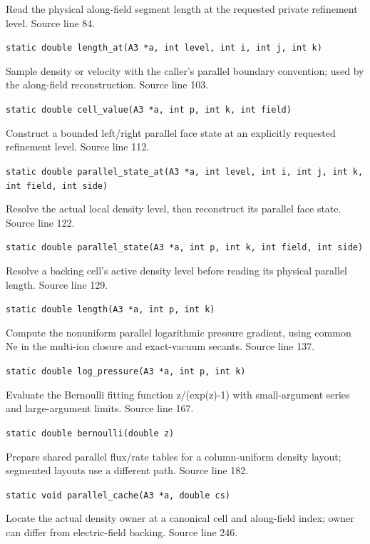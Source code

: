 \begin{description}[style=nextline,leftmargin=0pt,labelindent=0pt,labelwidth=0pt,labelsep=0pt]
\item[\texttt{length\_at}] Read the physical along-field segment length at the requested private refinement level. Source line 84.\par
{\small\nolinkurl{static double length_at(A3 *a, int level, int i, int j, int k)}}
\item[\texttt{cell\_value}] Sample density or velocity with the caller's parallel boundary convention; used by the along-field reconstruction. Source line 103.\par
{\small\nolinkurl{static double cell_value(A3 *a, int p, int k, int field)}}
\item[\texttt{parallel\_state\_at}] Construct a bounded left/right parallel face state at an explicitly requested refinement level. Source line 112.\par
{\small\nolinkurl{static double parallel_state_at(A3 *a, int level, int i, int j, int k, int field, int side)}}
\item[\texttt{parallel\_state}] Resolve the actual local density level, then reconstruct its parallel face state. Source line 122.\par
{\small\nolinkurl{static double parallel_state(A3 *a, int p, int k, int field, int side)}}
\item[\texttt{length}] Resolve a backing cell's active density level before reading its physical parallel length. Source line 129.\par
{\small\nolinkurl{static double length(A3 *a, int p, int k)}}
\item[\texttt{log\_pressure}] Compute the nonuniform parallel logarithmic pressure gradient, using common Ne in the multi-ion closure and exact-vacuum secants. Source line 137.\par
{\small\nolinkurl{static double log_pressure(A3 *a, int p, int k)}}
\item[\texttt{bernoulli}] Evaluate the Bernoulli fitting function z/(exp(z)-1) with small-argument series and large-argument limits. Source line 167.\par
{\small\nolinkurl{static double bernoulli(double z)}}
\item[\texttt{parallel\_cache}] Prepare shared parallel flux/rate tables for a column-uniform density layout; segmented layouts use a different path. Source line 182.\par
{\small\nolinkurl{static void parallel_cache(A3 *a, double cs)}}
\item[\texttt{density\_cover}] Locate the actual density owner at a canonical cell and along-field index; owner can differ from electric-field backing. Source line 246.\par

\end{description}
